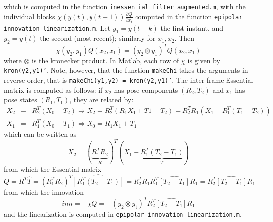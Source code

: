 \documentclass[]{article}
\begin{document}
which is computed in the function {\tt inessential filter augmented.m}, with the individual blocks $\chi(y(t),y(t-1)) \frac{\partial Q}{\partial x_t}$ computed in the function {\tt epipolar innovation linearization.m}. Let $y_1 = y(t-k)$ the first instant, and $y_2 = y(t)$ the second (most recent); similarly for $x_1, x_2$. Then
\begin{equation}
\chi(y_2,y_1)Q(x_2,x_1) = (y_2 \otimes y_1)^T Q(x_2,x_1)
\end{equation}
where $\otimes$ is the kronecker product. In Matlab, each row of $\chi$ is given by {\tt kron(y2,y1)'}. Note, however, that the function {\tt makeChi} takes the arguments in reverse order, that is {\tt makeChi(y1,y2) = kron(y2,y1)'}. The inter-frame Essential matrix is computed as follows: if $x_2$ has pose components $(R_2, T_2)$ and $x_1$ has pose states $(R_1, T_1)$, they are related by:
\begin{eqnarray}
X_2 & = & R_2^T(X_0 - T_2) \Rightarrow X_2 = R_2^T(R_1 X_1 + T1 - T_2) = R_2^T R_1(X_1 + R_1^T(T_1 - T_2)) \\
X_1 & = & R_1^T(X_0 - T_1) \Rightarrow X_0 = R_1 X_1 + T_1
\end{eqnarray}
which can be written as
\begin{equation}
X_2 = (\underbrace{R_1^T R_2}_R)^T\left( X_1 - \underbrace{R_1^T(T_2 - T_1)}_T\right)
\end{equation}
from which the Essential matrix
\begin{equation}
Q = R^T\widehat T = (R_1^T R_2)^T\widehat{[R_1^T(T_2 - T_1)]} = R_2^T R_1 R_1^T\widehat{[T_2-T_1]} R_1 =  R_2^T \widehat{[T_2-T_1]} R_1 
\end{equation}
from which the innovation
\begin{equation}
inn = - \chi Q = - (y_2 \otimes y_1)^T R_2^T \widehat{[T_2-T_1]} R_1 
\end{equation}
and the linearization is computed in {\tt epipolar innovation linearization.m}.
\end{document}
